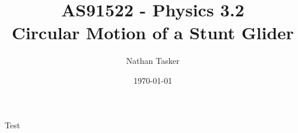 \documentclass[11pt, a4paper]{article}
\title{\small AS91522 - Physics 3.2\\ \huge Circular Motion of a Stunt Glider}
\author{Nathan Tasker}
\date{\today}
\begin{document}
	\maketitle
	Test
\end{document}
